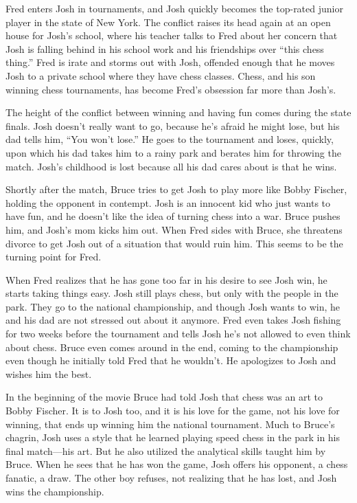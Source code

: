 \documentclass[onecolumn, 12pt]{article}
\begin{document}
Fred enters Josh in tournaments, and Josh quickly becomes the top-rated junior
player in the state of New York.  The conflict raises its head again at an open
house for Josh's school, where his teacher talks to Fred about her concern that
Josh is falling behind in his school work and his friendships over ``this chess
thing.''  Fred is irate and storms out with Josh, offended enough that he moves
Josh to a private school where they have chess classes.  Chess, and his son
winning chess tournaments, has become Fred's obsession far more than Josh's.

The height of the conflict between winning and having fun comes during the
state finals.  Josh doesn't really want to go, because he's afraid he might
lose, but his dad tells him, ``You won't lose.''  He goes to the tournament and
loses, quickly, upon which his dad takes him to a rainy park and berates him
for throwing the match.  Josh's childhood is lost because all his dad cares
about is that he wins.

Shortly after the match, Bruce tries to get Josh to play more like Bobby
Fischer, holding the opponent in contempt.  Josh is an innocent kid who just
wants to have fun, and he doesn't like the idea of turning chess into a war.
Bruce pushes him, and Josh's mom kicks him out.  When Fred sides with Bruce,
she threatens divorce to get Josh out of a situation that would ruin him.  This
seems to be the turning point for Fred.

When Fred realizes that he has gone too far in his desire to see Josh win, he
starts taking things easy.  Josh still plays chess, but only with the people in
the park.  They go to the national championship, and though Josh wants to win,
he and his dad are not stressed out about it anymore.  Fred even takes Josh
fishing for two weeks before the tournament and tells Josh he's not allowed to
even think about chess.  Bruce even comes around in the end, coming to the
championship even though he initially told Fred that he wouldn't.  He
apologizes to Josh and wishes him the best.  

In the beginning of the movie Bruce had told Josh that chess was an art to
Bobby Fischer.  It is to Josh too, and it is his love for the game, not his
love for winning, that ends up winning him the national tournament.  Much to
Bruce's chagrin, Josh uses a style that he learned playing speed chess in the
park in his final match---his art.  But he also utilized the analytical skills
taught him by Bruce.  When he sees that he has won the game, Josh offers his
opponent, a chess fanatic, a draw.  The other boy refuses, not realizing that
he has lost, and Josh wins the championship.
\end{document}
